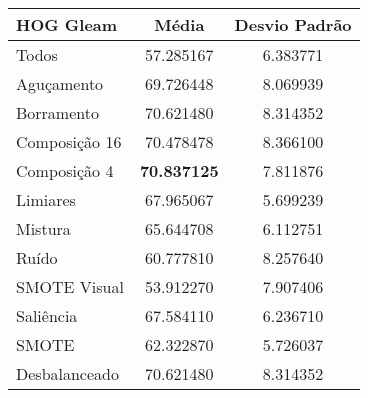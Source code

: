 
\begin{table}[!htbp]
\centering
\caption{}
\label{tab:resultados:x:melhor}
\begin{tabular}{|l|c|c|}
\hline
\textbf{HOG Gleam} & \textbf{Média}     & \textbf{Desvio Padrão} \\ \hline
   Todos        &  57.285167 &  6.383771  \\ \hline
  Aguçamento    &  69.726448 &  8.069939  \\ \hline
  Borramento    &  70.621480 &  8.314352  \\ \hline
  Composição 16 &  70.478478 &  8.366100  \\ \hline
  Composição 4  &  \textbf{70.837125} &  7.811876  \\ \hline
  Limiares      &  67.965067 &  5.699239  \\ \hline
  Mistura       &  65.644708 &  6.112751  \\ \hline
  Ruído         &  60.777810 &  8.257640  \\ \hline
  SMOTE Visual  &  53.912270 &  7.907406  \\ \hline
  Saliência     &  67.584110 &  6.236710  \\ \hline
 SMOTE          &  62.322870 &  5.726037  \\ \hline
Desbalanceado   &  70.621480 &  8.314352  \\ \hline
\end{tabular}
\end{table}

